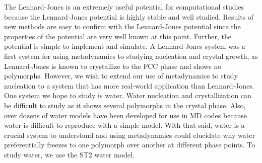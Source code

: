 \label{ST2}
The Lennard-Jones is an extremely useful potential for computational studies because the Lennard-Jones potential is highly stable and well studied.  Results of new methods are easy to confirm with the Lennard-Jones potential since the properties of the potential are very well known at this point.  Further, the potential is simple to implement and simulate.  A Lennard-Jones system was a first system for using metadynamics to studying nucleation and crystal growth, as Lennard-Jones is known to crystallize to the FCC phase and shows no polymorphs.  However, we wish to extend our use of metadynamics to study nucleation to a system that has more real-world application than Lennard-Jones.  One system we hope to study is water.  Water nucleation and crystallization can be difficult to study as it shows several polymorphs in the crystal phase.  Also, over dozens of water models have been developed for use in MD codes because water is difficult to reproduce with a simple model.  With that said, water is a crucial system to understand and using metadynamics could elucidate why water preferentially freezes to one polymorph over another at different phase points.  To study water, we use the ST2 water model.

